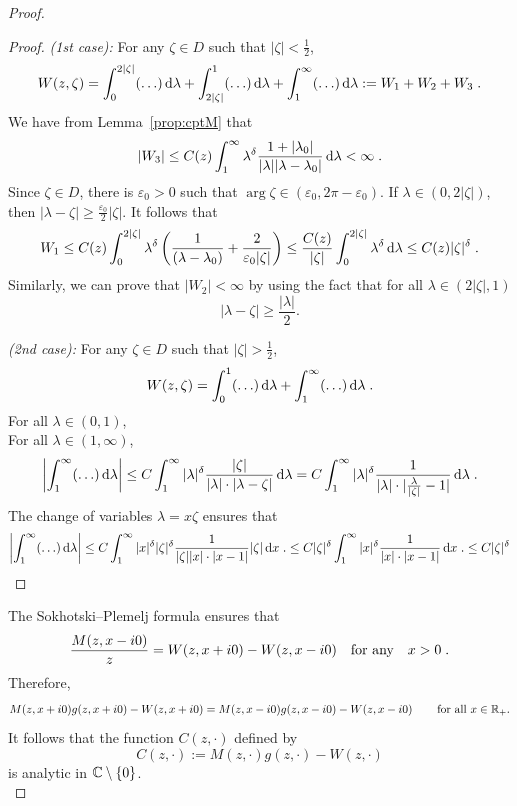 \documentclass[11pt]{amsart}
\newcommand{\diff}{\,\mathrm{d}}
\begin{document}
\begin{proof}
\begin{proof}
\textit{(1st case): }For any $\zeta \in D$ such that $|\zeta| < \frac{1}{2}$, 
\begin{align*}
    W(z, \zeta) = \int_0^{2|\zeta|} (\ldots)\diff \lambda + \int_{2|\zeta|}^1 (\ldots) \diff \lambda + \int_1^\infty (\ldots) \diff \lambda := W_1 + W_2 + W_3 \eqfinp
\end{align*}
We have from Lemma~\ref{prop:cptM} that
    $$ |W_3| \leq C(z) \int_1^\infty \lambda^\delta \frac{1+|\lambda_0|}{|\lambda||\lambda - \lambda_0|} \diff \lambda < \infty \eqfinp$$
Since $\zeta \in D$, there is $\varepsilon_0 > 0$ such that $\arg \zeta \in (\varepsilon_0, 2\pi - \varepsilon_0)$. If $\lambda \in (0, 2|\zeta|)$, then $|\lambda-\zeta| \geq \frac{\varepsilon_0}{2}|\zeta|$. It follows that 
    $$ W_1 \leq C(z)\int_0^{2|\zeta|} \lambda^\delta \left(\frac{1}{(\lambda-\lambda_0)}+ \frac{2}{\varepsilon_0 |\zeta|}\right) \leq \frac{C(z)}{|\zeta|} \int_0^{2|\zeta|} \lambda^\delta \diff \lambda \leq C(z)|\zeta|^\delta \eqfinp$$
Similarly, we can prove that $|W_2| < \infty$ by using the fact that for all $\lambda \in (2|\zeta|, 1)$ $$|\lambda-\zeta|\geq\frac{|\lambda|}{2}.$$

\textit{(2nd case):} For any $\zeta \in D$ such that $|\zeta| > \frac{1}{2}$, 
\begin{align*}
    W(z, \zeta) = \int_0^{1} (\ldots)\diff \lambda + \int_1^\infty (\ldots) \diff \lambda \eqfinp
\end{align*} 
For all $\lambda \in (0,1)$, \\
For all $\lambda \in (1, \infty)$, 
   $$\left| \int_1^\infty (\ldots) \diff \lambda \right|
   \leq C \int_1^\infty |\lambda|^\delta \frac{|\zeta|} {|\lambda|\cdot|\lambda-\zeta|} \diff \lambda  
   = C \int_1^\infty |\lambda|^\delta \frac{1} {|\lambda|\cdot|\frac{\lambda}{|\zeta|}-1|} \diff \lambda \eqfinp$$
The change of variables $\lambda = x \zeta$ ensures that 
    $$ 
    \left| \int_1^\infty (\ldots) \diff \lambda \right|
    \leq 
    C \int_1^\infty |x|^\delta |\zeta|^\delta \frac{1} {|\zeta||x|\cdot|x-1|} |\zeta|\diff x \eqfinp
    \leq 
    C |\zeta|^\delta \int_1^\infty |x|^\delta \frac{1}{|x|\cdot|x-1|}\diff x \eqfinp
    \leq C |\zeta|^\delta
    $$
\end{proof}


The Sokhotski–Plemelj formula ensures that 
\begin{align*}
    \frac{M(z,x-i0)}{z}
    = 
    W(z,x+i0) - W(z,x-i0)
    \quad \text{for any} \quad
    x > 0
    \; .
\end{align*}
Therefore, 
\begin{align*}
    M(z,x+i0)g(z, x+i0) -W(z,x+i0) = M(z,x-i0)g(z, x-i0) - W(z,x-i0) \, \qquad \text{for all $x\in\mathbb{R}_+$}.
\end{align*}
It follows that the function $C(z,\cdot)$ defined by 
$$ C(z,\cdot) := M(z,\cdot)g(z,\cdot) - W(z,\cdot)$$
is analytic in $\mathbb{C} \setminus \{0\}$.\\



\end{proof}
\end{document}
